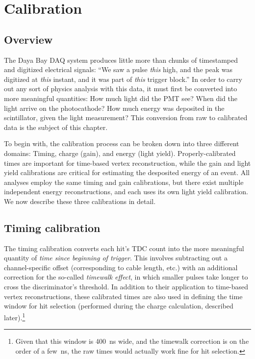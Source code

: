 \documentclass[../thesis.tex]{subfiles}
\begin{document}
\chapter{Calibration}
\label{chap:calib}

\section{Overview}

The Daya Bay DAQ system produces little more than chunks of timestamped and digitized electrical signals: ``We saw a pulse \textit{this} high, and the peak was digitized at \emph{this} instant, and it was part of \emph{this} trigger block.'' In order to carry out any sort of physics analysis with this data, it must first be converted into more meaningful quantities: How much light did the PMT see? When did the light arrive on the photocathode? How much energy was deposited in the scintillator, given the light measurement? This conversion from raw to calibrated data is the subject of this chapter.

To begin with, the calibration process can be broken down into three different domains: Timing, charge (gain), and energy (light yield). Properly-calibrated times are important for time-based vertex reconstruction, while the gain and light yield calibrations are critical for estimating the desposited energy of an event. All analyses employ the same timing and gain calibrations, but there exist multiple independent energy reconstructions, and each uses its own light yield calibration. We now describe these three calibrations in detail.

\section{Timing calibration}

The timing calibration converts each hit's TDC count into the more meaningful quantity of \emph{time since beginning of trigger}. This involves subtracting out a channel-specific offset (corresponding to cable length, etc.) with an additional correction for the so-called \emph{timewalk effect}, in which smaller pulses take longer to cross the discriminator's threshold. In addition to their application to time-based vertex reconstructions, these calibrated times are also used in defining the time window for hit selection (performed during the charge calculation, described later).\footnote{Given that this window is 400~ns wide, and the timewalk correction is on the order of a few~ns, the raw times would actually work fine for hit selection.}
\end{document}
